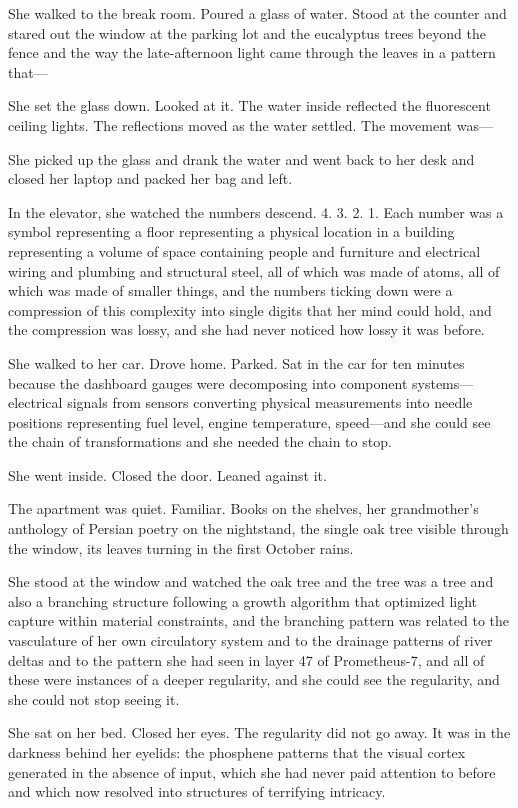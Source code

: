 She walked to the break room. Poured a glass of water. Stood at the counter and stared out the window at the parking lot and the eucalyptus trees beyond the fence and the way the late-afternoon light came through the leaves in a pattern that---

She set the glass down. Looked at it. The water inside reflected the fluorescent ceiling lights. The reflections moved as the water settled. The movement was---

She picked up the glass and drank the water and went back to her desk and closed her laptop and packed her bag and left.

In the elevator, she watched the numbers descend. 4. 3. 2. 1. Each number was a symbol representing a floor representing a physical location in a building representing a volume of space containing people and furniture and electrical wiring and plumbing and structural steel, all of which was made of atoms, all of which was made of smaller things, and the numbers ticking down were a compression of this complexity into single digits that her mind could hold, and the compression was lossy, and she had never noticed how lossy it was before.

She walked to her car. Drove home. Parked. Sat in the car for ten minutes because the dashboard gauges were decomposing into component systems---electrical signals from sensors converting physical measurements into needle positions representing fuel level, engine temperature, speed---and she could see the chain of transformations and she needed the chain to stop.

She went inside. Closed the door. Leaned against it.

The apartment was quiet. Familiar. Books on the shelves, her grandmother's anthology of Persian poetry on the nightstand, the single oak tree visible through the window, its leaves turning in the first October rains.

She stood at the window and watched the oak tree and the tree was a tree and also a branching structure following a growth algorithm that optimized light capture within material constraints, and the branching pattern was related to the vasculature of her own circulatory system and to the drainage patterns of river deltas and to the pattern she had seen in layer 47 of Prometheus-7, and all of these were instances of a deeper regularity, and she could see the regularity, and she could not stop seeing it.

She sat on her bed. Closed her eyes. The regularity did not go away. It was in the darkness behind her eyelids: the phosphene patterns that the visual cortex generated in the absence of input, which she had never paid attention to before and which now resolved into structures of terrifying intricacy.

